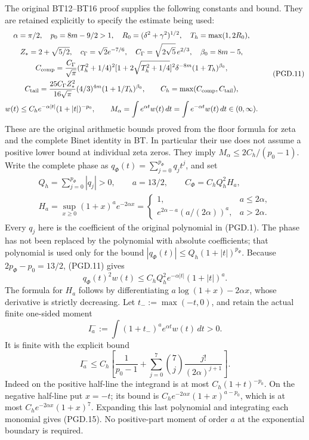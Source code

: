 The original BT12--BT16 proof supplies the following constants and
bound. They are retained explicitly to specify the estimate being used:
\[
 \begin{gathered}
 \alpha=\pi/2,\quad p_0=8m-9/2>1,\quad
 R_0=(\delta^2+\gamma^2)^{1/2},\quad T_h=\max(1,2R_0),\\
 Z_*=2+\sqrt{5/2},\quad
 c_\Gamma=\sqrt2e^{-7/6},\quad
 C_\Gamma=\sqrt{2\sqrt5}\,e^{2/3},\quad \beta_0=8m-5,\\
 C_{\rm comp}=\frac{C_\Gamma}{\sqrt\pi}(T_h^2+1/4)^2
       [1+2\sqrt{T_h^2+1/4}]^2
       \delta^{-8m}(1+T_h)^{\beta_0},\\
 C_{\rm tail}=\frac{25C_\Gamma Z_*^2}{16\sqrt\pi}
       (4/3)^{4m}(1+1/T_h)^{\beta_0},\qquad
 C_h=\max(C_{\rm comp},C_{\rm tail}),\\
 w(t)\leq C_he^{-\alpha|t|}(1+|t|)^{-p_0},\qquad
 M_\alpha=\int e^{\alpha t}w(t)\,dt
         =\int e^{-\alpha t}w(t)\,dt\in(0,\infty).
 \end{gathered}
 \tag{PGD.11}\label{eq:pgd-original-tail}
\]
These are the original arithmetic bounds proved from the floor formula
for zeta and the complete Binet identity in BT. In particular their
use does not assume a positive lower bound at individual zeta zeros.
They imply \(M_\alpha\leq2C_h/(p_0-1)\).
Write the complete phase as
\(q_\Phi(t)=\sum_{j=0}^{p_\Phi}q_jt^j\), and set
\[
 \begin{gathered}
 Q_h=\sum_{j=0}^{p_\Phi}|q_j|>0,\qquad
 a=13/2,\qquad C_\Phi=C_hQ_h^2H_a,\\
 H_a=\sup_{x\geq0}(1+x)^ae^{-2\alpha x}
  =\begin{cases}
      1,&a\leq2\alpha,\\
      e^{2\alpha-a}(a/(2\alpha))^a,&a>2\alpha.
    \end{cases}
 \end{gathered}
 \tag{PGD.12}\label{eq:pgd-phase-constants}
\]
Every \(q_j\) here is the coefficient of the original polynomial in
(PGD.1). The phase has not been replaced by the polynomial with
absolute coefficients; that polynomial is used only for the bound
\(|q_\Phi(t)|\leq Q_h(1+|t|)^{p_\Phi}\).
Because \(2p_\Phi-p_0=13/2\), (PGD.11) gives
\[
 q_\Phi(t)^2w(t)
       \leq C_hQ_h^2e^{-\alpha|t|}(1+|t|)^a.
 \tag{PGD.13}\label{eq:pgd-inserted-tail}
\]
The formula for \(H_a\) follows by differentiating
\(a\log(1+x)-2\alpha x\), whose derivative is strictly decreasing.
Let \(t_-:=\max(-t,0)\), and retain the actual finite one-sided moment
\[
 I_a^-:=\int (1+t_-)^ae^{\alpha t}w(t)\,dt>0.
 \tag{PGD.14}\label{eq:pgd-negative-moment}
\]
It is finite with the explicit bound
\[
 I_a^-\leq C_h\left[
       \frac1{p_0-1}
       +\sum_{j=0}^{7}\binom7j\frac{j!}{(2\alpha)^{j+1}}
                           \right].
 \tag{PGD.15}\label{eq:pgd-negative-moment-bound}
\]
Indeed on the positive half-line the integrand is at most
\(C_h(1+t)^{-p_0}\). On the negative half-line put \(x=-t\);
its bound is \(C_he^{-2\alpha x}(1+x)^{a-p_0}\), which is at
most \(C_he^{-2\alpha x}(1+x)^7\). Expanding this last polynomial
and integrating each monomial gives (PGD.15). No positive-part
moment of order \(a\) at the exponential boundary is required.

